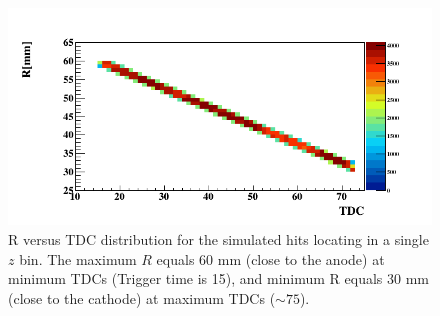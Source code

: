 \documentclass[twocolumn,showpacs,superscriptaddress,groupedaddress]{revtex4}
\begin{document}
\begin{figure}[tb]
\centering
\includegraphics[scale=0.37]{fig/TdcR_check_p1_10.png}
\caption{R versus TDC distribution for the simulated hits locating in a single 
$z$ bin. The maximum $R$ equals 60 mm (close to the anode) at minimum TDCs 
(Trigger time is 15), and minimum R equals 30 mm (close to the cathode) at 
maximum TDCs ($\sim75$).}
\label{fig:R_correlation}
\end{figure} 
\end{document}
